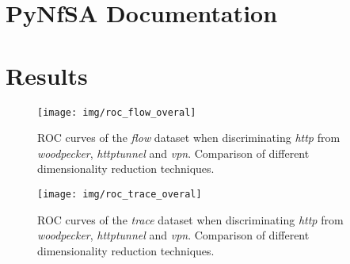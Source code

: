 
\thispagestyle{empty}  
\renewcommand{\appendixname}{Appendix}%

\begin{appendices}


\chapter{PyNfSA Documentation}\label{ch:appa}

\ifpdf%

\fi



\chapter{Results}\label{ch:appb}


%

\begin{figure}[h]%
  \centering
                \texttt{[image: img/roc\_flow\_overal]}
  \caption{\small ROC curves of the \emph{flow} dataset when discriminating \emph{http} from   \emph{woodpecker}, 
  \emph{httptunnel} and \emph{vpn}. Comparison of different dimensionality reduction techniques. }
  \label{fig:roc_flow_overal}
\end{figure}

\begin{figure}[h]%
  \centering
                \texttt{[image: img/roc\_trace\_overal]} 
  \caption{\small ROC curves of the \emph{trace} dataset when discriminating \emph{http} from   \emph{woodpecker}, 
  \emph{httptunnel} and \emph{vpn}. Comparison of different dimensionality reduction techniques. }
  \label{fig:roc_trace_overal}
\end{figure}
 


\end{appendices}
